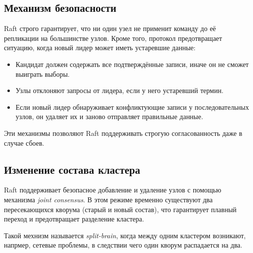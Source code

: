 \subsection{Механизм безопасности}

Raft строго гарантирует, что ни один узел не применит команду до её репликации на
большинстве узлов. Кроме того, протокол предотвращает ситуацию, когда новый лидер может
иметь устаревшие данные:

\begin{itemize}
    \item Кандидат должен содержать все подтверждённые записи, иначе он не сможет
    выиграть выборы.
    \item Узлы отклоняют запросы от лидера, если у него устаревший термин.
    \item Если новый лидер обнаруживает конфликтующие записи у последовательных узлов,
    он удаляет их и заново отправляет правильные данные.
\end{itemize}

Эти механизмы позволяют Raft поддерживать строгую согласованность даже в случае сбоев.

\subsection{Изменение состава кластера}

Raft поддерживает безопасное добавление и удаление узлов с помощью механизма
\textit{joint consensus}. В этом режиме временно существуют два пересекающихся кворума
(старый и новый состав), что гарантирует плавный переход и предотвращает разделение
кластера.

Такой мехнизм называется \textit{split-brain}, когда между одним кластером возникают, напрмер, сетевые
проблемы, в следствии чего один кворум распадается на два.
